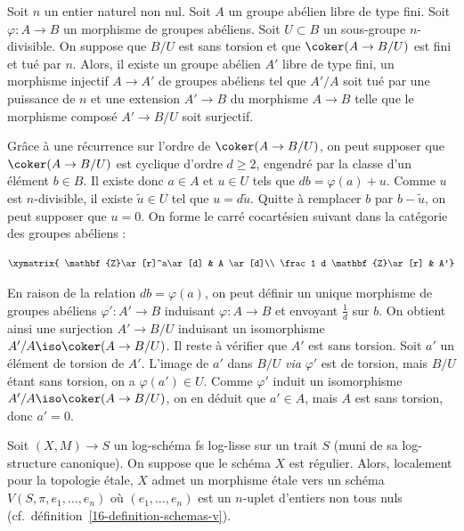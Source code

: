 \documentclass[10pt]{../fichiers-configuration-latex/smfart}
\begin{document}
\begin{lemme2}
Soit $n$ un entier naturel non nul.
Soit $A$ un groupe abélien libre de type fini.
Soit $\varphi\colon A\to B$ un morphisme de groupes abéliens.
Soit $U\subset B$ un sous-groupe $n$-divisible. On suppose que $B/U$ est
sans torsion et que $\coker(A\to
B/U)$ est fini et tué par $n$.
Alors, il existe un groupe abélien $A'$ libre de type fini,
un morphisme injectif $A\to A'$ de groupes abéliens tel que $A'/A$ soit tué
par une puissance de 
$n$ et une extension $A'\to B$ du morphisme $A\to B$ telle que le
morphisme composé $A'\to B/U$ soit surjectif.
\end{lemme2}

Grâce à une récurrence sur l'ordre de $\coker(A\to B/U)$, on peut supposer
que $\coker(A\to B/U)$ est cyclique d'ordre $d\geq 2$, engendré par la
classe d'un élément $b\in B$. Il existe donc $a\in A$ et $u\in U$ tels que
$db=\varphi(a)+u$. Comme $u$ est $n$-divisible, il existe $\tilde{u}\in U$
tel que $u=d\tilde{u}$. Quitte à remplacer $b$ par $b-\tilde{u}$, on peut
supposer que $u=0$. On forme le carré cocartésien suivant dans la catégorie
des groupes abéliens :

\[
\xymatrix{ \mathbf{Z}\ar[r]^a\ar[d] & A \ar[d]\\
\frac 1 d \mathbf{Z}\ar[r] & A'}
\]

En raison de la relation $db=\varphi(a)$, on peut définir un unique
morphisme de groupes abéliens $\varphi'\colon A'\to B$ induisant
$\varphi\colon A\to B$ et envoyant $\frac 1 d$ sur $b$. On obtient ainsi
une surjection $A'\to B/U$ induisant un isomorphisme $A'/A\iso
\coker(A\to B/U)$. Il reste à vérifier que $A'$ est sans torsion. Soit $a'$
un élément de torsion de $A'$. L'image de $a'$ dans $B/U$ \emph{via}
$\varphi'$ est de torsion, mais $B/U$ étant sans torsion, on a
$\varphi(a')\in U$. Comme $\varphi'$ induit un isomorphisme $A'/A\iso
\coker(A\to B/U)$, on en déduit que $a'\in A$, mais $A$ est sans torsion,
donc $a'=0$.

\begin{proposition2}\label{16-proposition-structure-locale-log-lisse-regulier}
Soit $(X,M)\to S$ un log-schéma fs log-lisse sur un trait $S$ (muni de sa
log-structure canonique). On suppose que le schéma $X$ est régulier. Alors,
localement pour la topologie étale, $X$ admet un morphisme étale vers un
schéma $V(S,\pi,e_1,\dots,e_n)$ où $(e_1,\dots,e_n)$ est un $n$-uplet
d'entiers non tous nuls (cf.~définition~\ref{16-definition-schemas-v}).
\end{proposition2}
\end{document}
